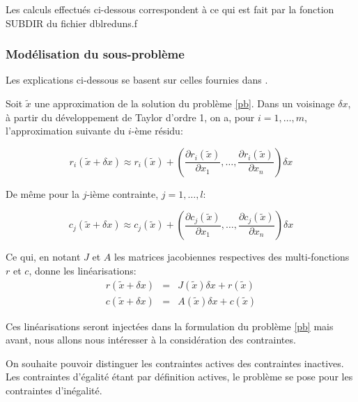 \documentclass[a4paper,11pt]{article}
\numberwithin{equation}{section}
\begin{document}
Les calculs effectués ci-dessous correspondent à ce qui est fait par la fonction SUBDIR du fichier dblreduns.f
\subsubsection{Modélisation du sous-problème} \label{gn:model}

Les explications ci-dessous se basent sur celles fournies dans \cite{lindstromwedin1988}.

Soit $\tilde{x}$ une approximation de la solution du problème \ref{pb}. Dans un voisinage $\delta x$, à partir du développement de Taylor d'ordre 1, on a, pour $i=1,\ldots,m$, l'approximation suivante du $i$-ème résidu:

\begin{equation}
r_{i}(\tilde{x} + \delta x) \approx r_{i}(\tilde{x}) + \left(\dfrac{\partial r_{i}(\tilde{x})}{\partial x_{1}}, \ldots, \dfrac{\partial r_{i}(\tilde{x})}{\partial x_{n}}\right)\delta x 
\end{equation}

De même pour la $j$-ième contrainte, $j=1,\ldots,l$: 

\begin{equation}
c_{j}(\tilde{x} + \delta x) \approx c_{j}(\tilde{x}) + \left(\dfrac{\partial c_{j}(\tilde{x})}{\partial x_{1}}, \ldots, \dfrac{\partial c_{j}(\tilde{x})}{\partial x_{n}}\right)\delta x 
\end{equation}

Ce qui, en notant $J$ et $A$ les matrices jacobiennes respectives des multi-fonctions $r$ et $c$, donne les linéarisations:
\begin{eqnarray} 
r(\tilde{x}+\delta x) &=& J(\tilde{x})\delta x + r(\tilde{x}) \label{linearisationr}\\
c(\tilde{x}+\delta x) &=& A(\tilde{x})\delta x + c(\tilde{x}) \label{linearisationc}
\end{eqnarray}

Ces linéarisations seront injectées dans la formulation du problème \ref{pb} mais avant, nous allons nous intéresser à la considération des contraintes.

On souhaite pouvoir distinguer les contraintes actives des contraintes inactives. Les contraintes d'égalité étant par définition actives, le problème se pose pour les contraintes d'inégalité. 
\end{document}

